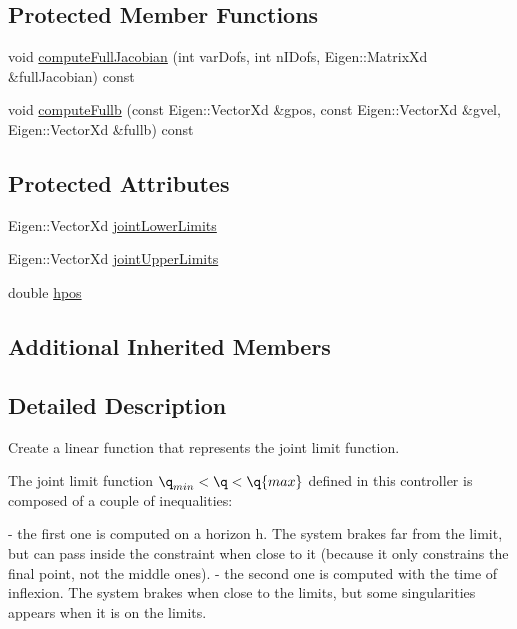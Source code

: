 \subsection*{Protected Member Functions}
\begin{DoxyCompactItemize}
\item 
void \hyperlink{classocra_1_1JointLimitFunction_a92b727925f262b9bfa806061c775358d}{compute\+Full\+Jacobian} (int var\+Dofs, int n\+I\+Dofs, Eigen\+::\+Matrix\+Xd \&full\+Jacobian) const 
\item 
void \hyperlink{classocra_1_1JointLimitFunction_a0e20a0f109b484fff1d972ecfb5a85f0}{compute\+Fullb} (const Eigen\+::\+Vector\+Xd \&gpos, const Eigen\+::\+Vector\+Xd \&gvel, Eigen\+::\+Vector\+Xd \&fullb) const 
\end{DoxyCompactItemize}
\subsection*{Protected Attributes}
\begin{DoxyCompactItemize}
\item 
Eigen\+::\+Vector\+Xd \hyperlink{classocra_1_1JointLimitFunction_ab0dbcf53e97b8f4b7a56478bd09240f1}{joint\+Lower\+Limits}
\item 
Eigen\+::\+Vector\+Xd \hyperlink{classocra_1_1JointLimitFunction_a8ea9cd9be8cc3eb55d7d988ba8c5f7e4}{joint\+Upper\+Limits}
\item 
double \hyperlink{classocra_1_1JointLimitFunction_affab56a4cc60a886b51c2ef0644d44ba}{hpos}
\end{DoxyCompactItemize}
\subsection*{Additional Inherited Members}


\subsection{Detailed Description}
Create a linear function that represents the joint limit function. 

The joint limit function $ \q_{min} < \q < \q{max} $ defined in this controller is composed of a couple of inequalities\+: \begin{DoxyVerb} - the first one is computed on a horizon h. The system brakes far from the limit, but can pass inside the constraint when close to it (because it only constrains the final point, not the middle ones).
 - the second one is computed with the time of inflexion. The system brakes when close to the limits, but some singularities appears when it is on the limits.
\end{DoxyVerb}


